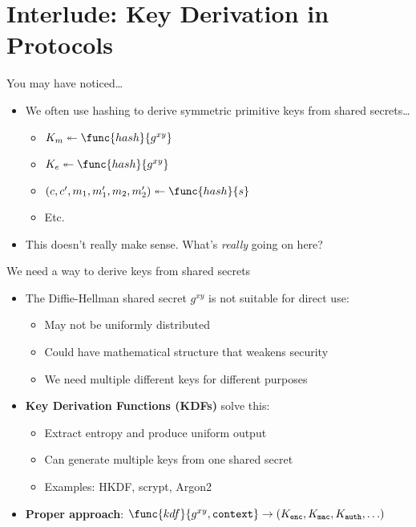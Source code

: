 \documentclass[aspectratio=169, lualatex, handout]{beamer}
\begin{document}
\section{Interlude: Key Derivation in Protocols}

\begin{frame}{You may have noticed\ldots}
	\begin{itemize}
		\item We often use hashing to derive symmetric primitive keys from shared secrets\ldots
		      \begin{itemize}
			      \item $K_m \twoheadleftarrow \func{hash}{g^{xy}}$
			      \item $K_e \twoheadleftarrow \func{hash}{g^{xy}}$
			      \item $(c, c', m_{1}, m_{1}', m_{2}, m_{2}')  \twoheadleftarrow \func{hash}{s}$
			      \item Etc.
		      \end{itemize}
		\item This doesn't really make sense. What's \textit{really} going on here?
	\end{itemize}
\end{frame}

\begin{frame}{We need a way to derive keys from shared secrets}
	\begin{itemize}
		\item The Diffie-Hellman shared secret $g^{xy}$ is not suitable for direct use:
		      \begin{itemize}
			      \item May not be uniformly distributed
			      \item Could have mathematical structure that weakens security
			      \item We need multiple different keys for different purposes
		      \end{itemize}
		\item \textbf{Key Derivation Functions (KDFs)} solve this:
		      \begin{itemize}
			      \item Extract entropy and produce uniform output
			      \item Can generate multiple keys from one shared secret
			      \item Examples: HKDF, scrypt, Argon2
		      \end{itemize}
		\item \textbf{Proper approach}: $\func{kdf}{g^{xy}, \texttt{context}} \rightarrow (K_{\texttt{enc}}, K_{\texttt{mac}}, K_{\texttt{auth}}, \ldots)$
	\end{itemize}
\end{frame}
\end{document}
